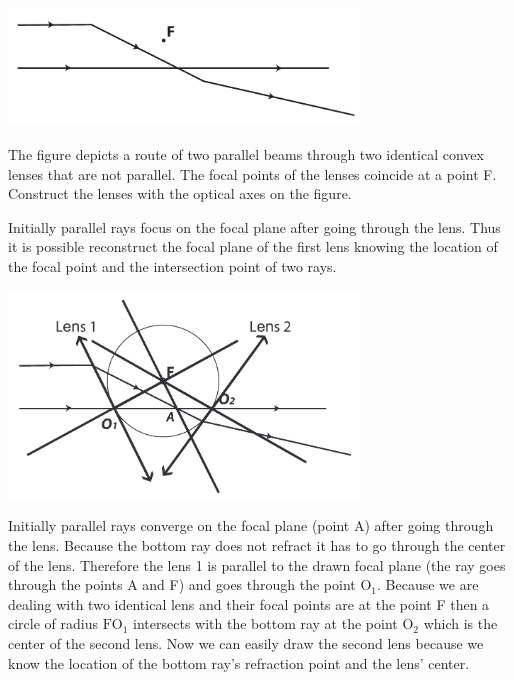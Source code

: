{\ifEngStatement
\begin{center}
  \includegraphics[width=0.7\textwidth]{2014-lahg-07-optilineskeemjoonis}
\end{center}
The figure depicts a route of two parallel beams through two identical convex lenses that are not parallel. The focal points of the lenses coincide at a point F. Construct the lenses with the optical axes on the figure.
\fi


\ifEngHint
Initially parallel rays focus on the focal plane after going through the lens. Thus it is possible reconstruct the focal plane of the first lens knowing the location of the focal point and the intersection point of two rays.
\fi


\ifEngSolution
\begin{center}
\includegraphics[width=0.7\textwidth]{2014-lahg-07-optilineskeemlahendus_ing}
\end{center}
Initially parallel rays converge on the focal plane (point A) after going through the lens. Because the bottom ray does not refract it has to go through the center of the lens. Therefore the lens 1 is parallel to the drawn focal plane (the ray goes through the points A and F) and goes through the point $\text{O}_1$. Because we are dealing with two identical lens and their focal points are at the point F then a circle of radius $\text{FO}_1$ intersects with the bottom ray at the point $\text{O}_2$ which is the center of the second lens. Now we can easily draw the second lens because we know the location of the bottom ray’s refraction point and the lens’ center.
\fi
}